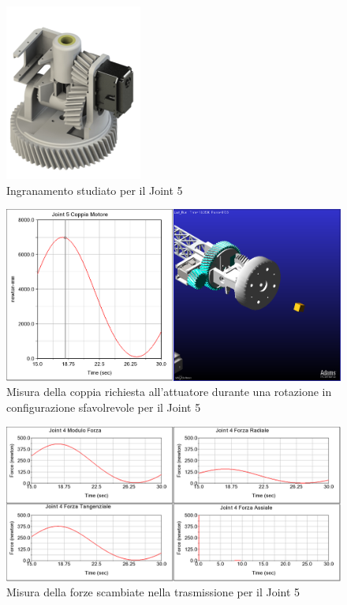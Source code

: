 \documentclass[%
corpo=11pt,
twoside,
 stile=classica,
oldstyle,
greek,%
]{toptesi}
\begin{document}
			\begin{figure} [H]
			\centering
			\includegraphics[width=0.4\textwidth]{Plots/POLSO2/wrist2.png}
			\caption{Ingranamento studiato per il Joint 5}
			\label{fig:wrist2}
		\end{figure} 
		\begin{figure} [H]
			\centering
			\includegraphics[width=1\textwidth]{Plots/POLSO2/polso2torque.png}
			\caption{Misura della coppia richiesta all'attuatore durante una rotazione in configurazione sfavolrevole per il Joint 5}
			\label{fig:MBDpolso2t}
		\end{figure} 
		\begin{figure} [H]
			\centering
			\includegraphics[width=1\textwidth]{Plots/POLSO2/polso2forces.png}
			\caption{Misura della forze scambiate nella trasmissione per il Joint 5}
			\label{fig:MBDpolso2f}
		\end{figure} 
\end{document}
